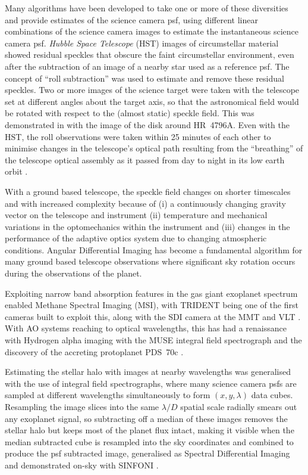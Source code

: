 \documentclass[letterpaper]{ar-1col}
\newcommand{\ld}{$\lambda/D$}
\begin{document}
Many algorithms have been developed to take one or more of these diversities and provide estimates of the science camera \ac{psf}, using different linear combinations of the science camera images to estimate the instantaneous science camera \ac{psf}.
%
{\it Hubble Space Telescope} (HST) images of circumstellar material showed residual speckles that obscure the faint circumstellar environment, even after the subtraction of an image of a nearby star used as a reference \ac{psf}.
%
The concept of ``roll subtraction''  \citep{Schneider98} was used to estimate and remove these residual speckles.
%
Two or more images of the science target were taken with the telescope set at different angles about the target axis, so that the astronomical field would be rotated with respect to the (almost static) speckle field.
%
This was demonstrated in \citet{Schneider99} with the image of the disk around HR~4796A.
%
Even with the HST, the roll observations were taken within 25 minutes of each other to minimise changes in the telescope's optical path resulting from the ``breathing'' of the telescope optical assembly as it passed from day to night in its low earth orbit \citep{Bely93}.

With a ground based telescope, the speckle field changes on shorter timescales and with increased complexity because of (i) a continuously changing gravity vector on the telescope and instrument (ii) temperature and mechanical variations in the optomechanics within the instrument and (iii) changes in the performance of the adaptive optics system due to changing atmospheric conditions.
%
Angular Differential Imaging \citep[ADI; ][]{Marois06} has become a fundamental algorithm for many ground based telescope observations where significant sky rotation occurs during the observations of the planet.

Exploiting narrow band absorption features in the gas giant exoplanet spectrum enabled Methane Spectral Imaging (MSI), with TRIDENT \citep{Marois05} being one of the first cameras built to exploit this, along with the SDI camera at the MMT and VLT \citep{Biller07-1}.
%
With AO systems reaching to optical wavelengths, this has had a renaissance with Hydrogen alpha imaging with the MUSE integral field spectrograph and the discovery of the accreting protoplanet PDS~70c \citep{Haffert19}.

Estimating the stellar halo with images at nearby wavelengths was generalised with the use of integral field spectrographs, where many science camera \acp{psf} are sampled at different wavelengths simultaneously to form $(x,y,\lambda)$ data cubes.
%
Resampling the image slices into the same \ld{} spatial scale radially smears out any exoplanet signal, so subtracting off a median of these images removes the stellar halo but keeps most of the planet flux intact, making it visible when the median subtracted cube is resampled into the sky coordinates and combined to produce the \ac{psf} subtracted image, generalised as Spectral Differential Imaging \cite[SDI; ][]{Sparks02} and demonstrated on-sky with SINFONI \citep{Thatte07}.
\end{document}
